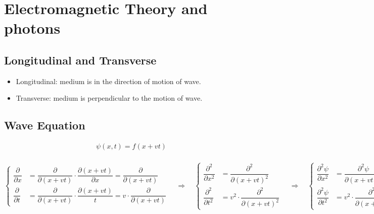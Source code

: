 \chapter{Electromagnetic Theory and photons}

\section{Longitudinal and Transverse}

\begin{itemize}
\item Longitudinal: medium is in the direction of motion of wave.
\item Transverse: medium is perpendicular to the motion of wave.
  
\end{itemize}

\section{Wave Equation}

\begin{equation*}
  \begin{aligned}
    \psi \left( x, t \right) = f \left( x + v t \right) \\
  \end{aligned}
\end{equation*}

\begin{equation*}
  \left\{
  \begin{aligned}
    \dfrac{\partial}{\partial x} &= \dfrac{\partial}{\partial \left( x + v t \right)} \cdot \dfrac{\partial \left( x + v t \right)}{\partial x} = \dfrac{\partial}{\partial \left( x + v t \right)} \\   
    \dfrac{\partial}{\partial t} &= \dfrac{\partial}{\partial \left( x + v t \right)} \cdot \dfrac{\partial \left( x + v t \right)}{t} = v \cdot \dfrac{\partial}{\partial \left( x + v t \right)}     
  \end{aligned}
  \right.
  \quad \Rightarrow \quad  
  \left\{
  \begin{aligned}
    \dfrac{\partial^2}{\partial x^2} &= \dfrac{\partial^2}{\partial \left( x + v t \right)^2} \\
    \dfrac{\partial^2}{\partial t^2} &= v^2 \cdot \dfrac{\partial^2}{\partial \left( x + v t \right)^2}  
  \end{aligned}
  \right.
  \quad \Rightarrow \quad  
  \left\{
  \begin{aligned}
    \dfrac{\partial^2 \psi}{\partial x^2} &= \dfrac{\partial^2 \psi}{\partial \left( x + v t \right)^2} \\
    \dfrac{\partial^2 \psi}{\partial t^2} &= v^2 \cdot \dfrac{\partial^2 \psi}{\partial \left( x + v t \right)^2}  
  \end{aligned}
  \right.
\end{equation*}

